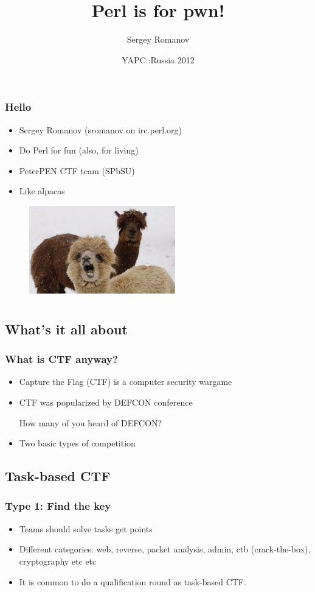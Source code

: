 \documentclass{beamer}
\title{Perl is for pwn!}
\author{Sergey Romanov}
\date{YAPC::Russia 2012}
\begin{document}
\frame{\titlepage}

\frame
{
\frametitle{Hello}
\begin{itemize}
\item Sergey Romanov (sromanov on irc.perl.org)
\item Do Perl for fun (also, for living)
\item PeterPEN CTF team (SPbSU)
\item Like alpacas
\end{itemize}
\begin{figure}
\includegraphics[width=2.5in,height=1.5in]{pics/alpacas.jpg}
\end{figure}
}

\section[CTF]{}

\subsection{What's it all about}
\frame
{
\frametitle{What is CTF anyway?}
\begin{itemize}
\item<1-> Capture the Flag (CTF) is a computer security wargame
\item<2-> CTF was popularized by DEFCON conference 
\linebreak

{\Large How many of you heard of DEFCON?}
\item<3-> Two basic types of competition
\end{itemize}
}

\subsection{Task-based CTF}
\frame
{
\frametitle{Type 1: Find the key}
\begin{itemize}
\item Teams should solve tasks get points
\item Different categories: web, reverse, packet analysis, admin, ctb (crack-the-box), cryptography etc etc
\item It is common to do a qualification round as task-based CTF.
\end{itemize}
}
\end{document}
